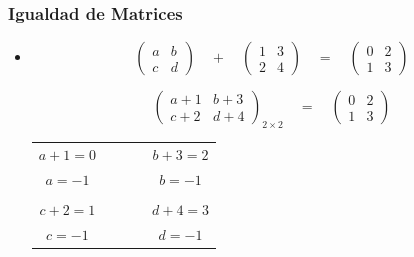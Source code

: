 \documentclass[stu, 12pt, a4paper, donotrepeattitle, floatsintext, natbib]{apa7}
\begin{document}
    \subsubsection{Igualdad de Matrices}
    \begin{itemize}
        \item \begin{equation*}
                  \begin{pmatrix}
                      a & b \\
                      c & d
                  \end{pmatrix}
                  \quad
                  +
                  \quad
                  \begin{pmatrix}
                      1 & 3 \\
                      2 & 4
                  \end{pmatrix}
                  \quad
                  =
                  \quad
                  \begin{pmatrix}
                      0 & 2 \\
                      1 & 3
                  \end{pmatrix}
        \end{equation*}

        \begin{equation*}
            \begin{pmatrix}
                a+1 & b+3 \\
                c+2 & d+4
            \end{pmatrix}_{2\times 2}
            \quad
            =
            \quad
            \begin{pmatrix}
                0 & 2 \\
                1 & 3
            \end{pmatrix}
        \end{equation*}

        \begin{table}
            \label{tab:igualdad-matrices}
            \centering
            \begin{tabular}{ccc}
                $a+1=0$ & $\qquad$ & $b+3=2$ \\
                $a=-1$  &          & $b=-1$  \\
                \\
                $c+2=1$ & & $d+4=3$ \\
                $c=-1$ & & $d=-1$
            \end{tabular}
        \end{table}



\end{itemize}
\end{document}

